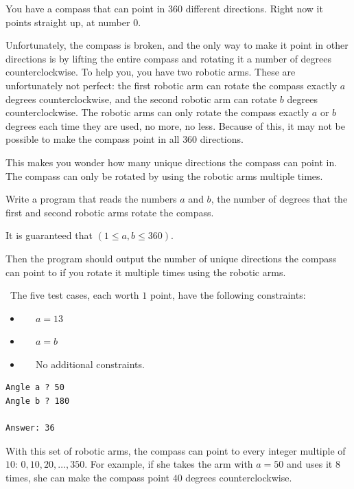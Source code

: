 You have a compass that can point in $360$ different directions. Right now it points straight up, at number $0$.

Unfortunately, the compass is broken, and the only way to make it point in other directions
is by lifting the entire compass and rotating it a number of degrees counterclockwise. To help you, you have
two robotic arms. These are unfortunately not perfect: the first robotic arm can
rotate the compass exactly $a$ degrees counterclockwise, and the second robotic arm can rotate $b$ degrees counterclockwise.
The robotic arms can only rotate the compass exactly $a$ or $b$ degrees each time
they are used, no more, no less.
Because of this, it may not be possible to make the compass point
in all $360$ directions.

This makes you wonder how many unique directions the compass can point in.
The compass can only be rotated by using the robotic arms multiple times.

Write a program that reads the numbers $a$ and $b$, the number of degrees that the first and second robotic arms rotate the compass.

It is guaranteed that $(1 \leq a,b \leq 360)$.

Then the program should output the number of unique directions the compass can point to if you rotate it multiple times using the robotic arms.

\
The five test cases, each worth $1$ point, have the following constraints:
\begin{itemize}
\item[(1)] $\;\;\;\;$ $a = 13$
\item[(2-3)] $\;\;\;\;$ $a = b$
\item[(4-5)] $\;\;\;\;$ No additional constraints.
\end{itemize}

\vspace{0.3cm}

\begin{verbatim}
Angle a ? 50
Angle b ? 180

Answer: 36
\end{verbatim}
 With this set of robotic arms, the compass
can point to every integer multiple of $10$: $0, 10, 20, \dots, 350$.
For example, if she takes the arm with $a=50$ and uses it $8$ times, she can make the compass point $40$ degrees counterclockwise.

\vspace{0.4cm}

